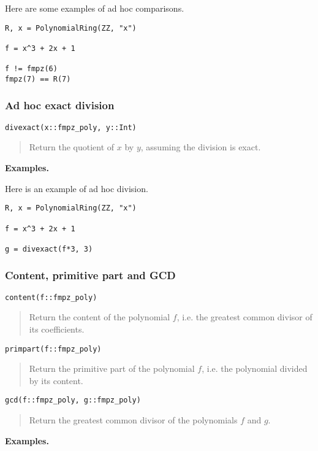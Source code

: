 \documentclass[a4paper,10pt]{article}
\newcommand{\desc}[1]{\vspace{-3mm}\begin{quote}#1\end{quote}}
\begin{document}
{{Here are some examples of ad hoc comparisons.

\begin{lstlisting}
R, x = PolynomialRing(ZZ, "x")

f = x^3 + 2x + 1

f != fmpz(6)
fmpz(7) == R(7)
\end{lstlisting}

\subsubsection{Ad hoc exact division}

\begin{lstlisting}
divexact(x::fmpz_poly, y::Int)
\end{lstlisting}

\desc{Return the quotient of $x$ by $y$, assuming the division is exact.}

\textbf{Examples.}

Here is an example of ad hoc division.

\begin{lstlisting}
R, x = PolynomialRing(ZZ, "x")

f = x^3 + 2x + 1

g = divexact(f*3, 3)
\end{lstlisting}

\subsubsection{Content, primitive part and GCD}

\begin{lstlisting}
content(f::fmpz_poly)
\end{lstlisting}

\desc{Return the content of the polynomial $f$, i.e. the greatest common divisor of its
coefficients.}

\begin{lstlisting}
primpart(f::fmpz_poly)
\end{lstlisting}

\desc{Return the primitive part of the polynomial $f$, i.e. the polynomial divided by
its content.}

\begin{lstlisting}
gcd(f::fmpz_poly, g::fmpz_poly)
\end{lstlisting}

\desc{Return the greatest common divisor of the polynomials $f$ and $g$.}

\textbf{Examples.}

}}
\end{document}
